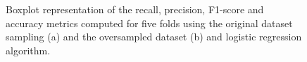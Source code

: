 \begin{figure}[H]
\centering
  \qquad
\caption{Boxplot representation of the recall, precision, F1-score and accuracy metrics computed for five folds using the original dataset sampling (a) and the oversampled dataset (b) and logistic regression algorithm.}
\label{figure_metrics_LR}
\end{figure}

